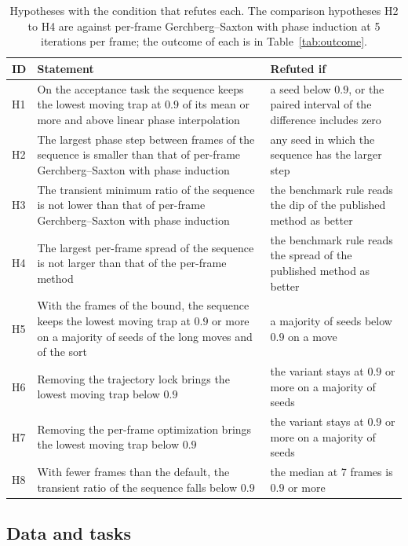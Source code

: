 \begin{table}[t]
\centering\small
\caption{Hypotheses with the condition that refutes each. The comparison hypotheses H2 to H4 are against per-frame Gerchberg--Saxton with phase induction at 5 iterations per frame; the outcome of each is in Table~\ref{tab:outcome}.}
\label{tab:hyp}
\begin{tabular}{@{}l p{6.7cm} p{6.0cm}@{}}
\toprule
ID & Statement & Refuted if\\
\midrule
H1 & On the acceptance task the sequence keeps the lowest moving trap at $0.9$ of its mean or more and above linear phase interpolation & a seed below $0.9$, or the paired interval of the difference includes zero\\
H2 & The largest phase step between frames of the sequence is smaller than that of per-frame Gerchberg--Saxton with phase induction & any seed in which the sequence has the larger step\\
H3 & The transient minimum ratio of the sequence is not lower than that of per-frame Gerchberg--Saxton with phase induction & the benchmark rule reads the dip of the published method as better\\
H4 & The largest per-frame spread of the sequence is not larger than that of the per-frame method & the benchmark rule reads the spread of the published method as better\\
H5 & With the frames of the bound, the sequence keeps the lowest moving trap at $0.9$ or more on a majority of seeds of the long moves and of the sort & a majority of seeds below $0.9$ on a move\\
H6 & Removing the trajectory lock brings the lowest moving trap below $0.9$ & the variant stays at $0.9$ or more on a majority of seeds\\
H7 & Removing the per-frame optimization brings the lowest moving trap below $0.9$ & the variant stays at $0.9$ or more on a majority of seeds\\
H8 & With fewer frames than the default, the transient ratio of the sequence falls below $0.9$ & the median at 7 frames is $0.9$ or more\\
\bottomrule
\end{tabular}
\end{table}

\subsection{Data and tasks}

